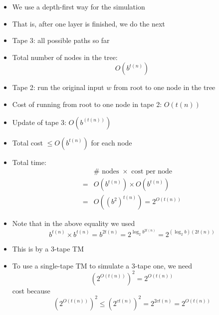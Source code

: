 \begin{frame}[allowframebreaks]
\begin{itemize}
\item We use a depth-first way for the simulation
\item That is, after one layer is finished, we do the next

\item Tape 3: all possible paths so far

\item Total number of nodes in the tree:
\begin{equation*}
  O(b^{t(n)})
\end{equation*}

\item Tape 2: run the original input $w$ from root to one node in the
  tree

\item Cost of running from root to one node in tape 2: $O(t(n))$

\item Update of tape 3: $O(b^{(t(n))})$

\item Total cost $\leq O(b^{t(n)})$ for each node
\item Total time:
  \begin{equation*}
    \begin{split}
& \# \text{ nodes } \times \text{ cost per node}\\      
= &   O(b^{t(n)}) \times O(b^{t(n)}) \\
= & O((b^2)^{t(n)} ) = 2^{O(t(n))}
\end{split}
\end{equation*}
\item Note that in the above equality we used
  \begin{equation*}
    b^{t(n)} \times b^{t(n)}
    = b^{2t(n)} =
    2^{\log_2 b^{2t(n)}} = 2^{(\log_2 b)(2 t(n))}
  \end{equation*}

\item This is by a 3-tape TM
\item To use a single-tape TM to simulate a 3-tape one, we need
  \begin{equation*}
(2^{O(t(n))})^2
= 2^{O(t(n))}
\end{equation*}
cost because
\begin{equation*}
  (2^{O(t(n))})^2
\leq (2^{ct(n)})^2
= 2^{2ct(n)} 
= 2^{O(t(n))}
\end{equation*}
\end{itemize}\end{frame}


